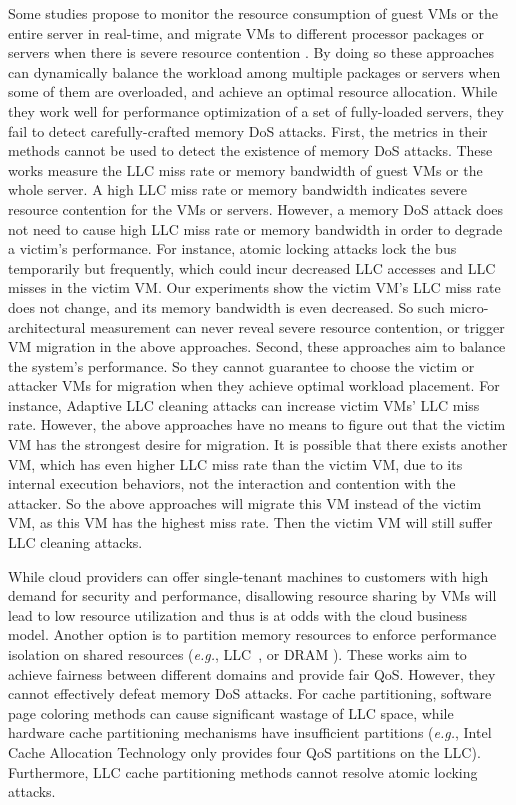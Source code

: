 \documentclass{sig-alternate}
\newcommand{\bheading}[1]{{\vspace{2pt}\noindent{\textbf{#1}}\hspace{2pt}}}
\newcommand{\eg}{\emph{e.g.}\xspace}
\newcommand{\attackname}{memory DoS attacks\xspace}
\newcommand{\aattackname}{memory DoS attack\xspace}
\begin{document}
\bheading{Load-triggered VM migration.} Some studies propose to monitor the resource consumption of guest VMs or the entire server in real-time, and migrate VMs to different processor packages or servers when there is severe resource contention \cite{HuiBlZhFe:10, ZhBlFe:10, AhKiHa:12, WaIsSu:15}. By doing so these approaches can dynamically balance the workload among multiple packages or servers when some of them are overloaded, and achieve an optimal resource allocation. While they work well for performance optimization of a set of fully-loaded servers, they fail to detect carefully-crafted \attackname. First, the metrics in their methods cannot be used to detect the existence of \attackname. These works measure the LLC miss rate \cite{HuiBlZhFe:10, ZhBlFe:10} or memory bandwidth \cite{AhKiHa:12, WaIsSu:15} of guest VMs or the whole server. A high LLC miss rate or memory bandwidth indicates severe resource contention for the VMs or servers. However, a \aattackname does not need to cause high LLC miss rate or memory bandwidth in order to degrade a victim's performance. For instance, atomic locking attacks lock the bus temporarily but frequently, which could incur decreased LLC accesses and LLC misses in the victim VM. Our experiments show the victim VM's LLC miss rate does not change, and its memory bandwidth is even decreased. So such micro-architectural measurement can never reveal severe resource contention, or trigger VM migration in the above approaches. Second, these approaches aim to balance the system's performance. So they cannot guarantee to choose the victim or attacker VMs for migration when they achieve optimal workload placement. For instance, Adaptive LLC cleaning attacks can increase victim VMs' LLC miss rate. However, the above approaches have no means to figure out that the victim VM has the strongest desire for migration. It is possible that there exists another VM, which has even higher LLC miss rate than the victim VM, due to its internal execution behaviors, not the interaction and contention with the attacker. So the above approaches will migrate this VM instead of the victim VM, as this VM has the highest miss rate. Then the victim VM will still suffer LLC cleaning attacks. 



 
\bheading{Performance isolation.} While cloud providers can offer single-tenant
machines to customers with high demand for security and performance, disallowing
resource sharing by VMs will lead to low resource utilization and thus is at odds 
with the cloud business model. Another option is to partition memory resources to
enforce performance isolation on shared resources (\eg, LLC~\cite{WaLe:07, 
SaKo:11, KiPeMa:12, CoMoBi:13, KiKiHu:14, intel_cat}, or DRAM
\cite{MoMu:07, MuSuMu:11, WaFeSu:14}). These works aim to achieve fairness 
between different domains and provide fair QoS. However, they cannot effectively 
defeat \attackname. For cache partitioning, software page coloring methods 
\cite{KiPeMa:12} can cause significant wastage of 
LLC space, while hardware cache partitioning mechanisms have insufficient 
partitions (\eg, Intel Cache Allocation Technology \cite{intel_cat} only provides 
four QoS partitions on the LLC). Furthermore, LLC cache partitioning methods 
cannot resolve atomic locking attacks.
\end{document}
